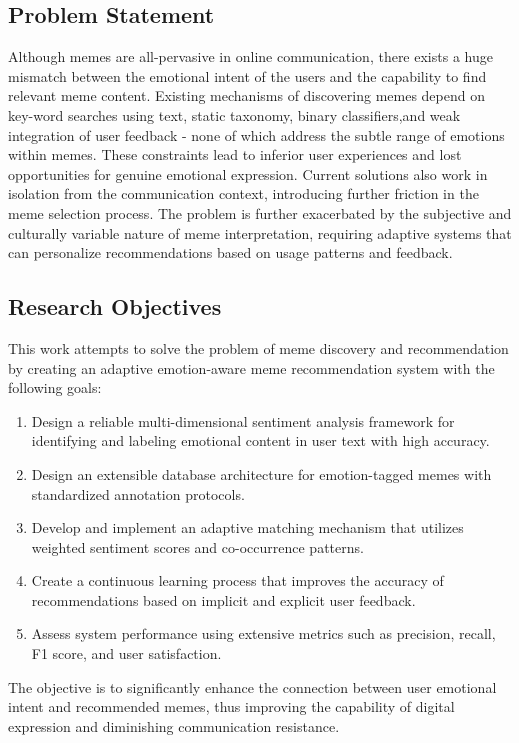 \documentclass[conference]{IEEEtran}
\begin{document}
\subsection{Problem Statement}
Although memes are all-pervasive in online communication, there exists a huge mismatch between the emotional intent of the users and the capability to find relevant meme content. Existing mechanisms of discovering memes depend on key-word searches using text, static taxonomy, binary classifiers,and weak integration of user feedback - none of which address the subtle range of emotions within memes. These constraints lead to inferior user experiences and lost opportunities for genuine emotional expression. Current solutions also work in isolation from the communication context, introducing further friction in the meme selection process. The problem is further exacerbated by the subjective and culturally variable nature of meme interpretation, requiring adaptive systems that can personalize recommendations based on usage patterns and feedback.

\subsection{Research Objectives}
This work attempts to solve the problem of meme discovery
and recommendation by creating an adaptive emotion-aware
meme recommendation system with the following goals:
\begin{enumerate}
    \item Design a reliable multi-dimensional sentiment analysis framework for identifying and labeling emotional content in user text with high accuracy.
    \item Design an extensible database architecture for emotion-tagged memes with standardized annotation protocols.
    \item Develop and implement an adaptive matching mechanism that utilizes weighted sentiment scores and co-occurrence patterns.
    \item Create a continuous learning process that improves the accuracy of recommendations based on implicit and explicit user feedback.
    \item Assess system performance using extensive metrics such as precision, recall, F1 score, and user satisfaction.
\end{enumerate}

The objective is to significantly enhance the connection between user emotional intent and recommended memes, thus improving the capability of digital expression and diminishing communication resistance.
\end{document}
